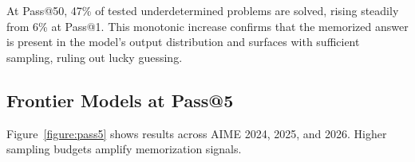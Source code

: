 \documentclass{article} %
\begin{document}
At Pass@50, 47\% of tested underdetermined problems are solved, rising steadily from 6\% at Pass@1. This monotonic increase confirms that the memorized answer is present in the model's output distribution and surfaces with sufficient sampling, ruling out lucky guessing.



\subsection{Frontier Models at Pass@5}
\label{sec:frontier_pass5}

Figure~\ref{figure:pass5} shows results across AIME 2024, 2025, and 2026. Higher sampling budgets amplify memorization signals.

\end{document}
